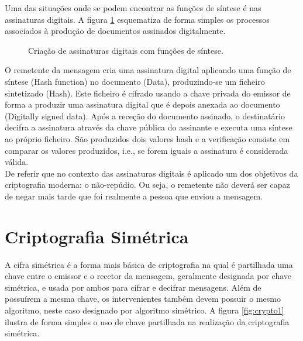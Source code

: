 \documentclass[a4paper,11pt,openright,oneside]{report}
\begin{document}
Uma das situações onde se podem encontrar as funções de síntese é nas assinaturas digitais. A figura \ref{fig:crypto5} esquematiza de forma simples os processos associados à produção de documentos assinados digitalmente.

\begin{figure}[ht]
\center
{}
\caption{Criação de assinaturas digitais com funções de síntese.}
\label{fig:crypto5}
\end{figure}

O remetente da mensagem cria uma assinatura digital aplicando uma função de síntese (Hash function) no documento (Data), produzindo-se um ficheiro sintetizado (Hash). Este ficheiro é cifrado usando a chave privada do emissor de forma a produzir uma assinatura digital que é depois anexada ao documento (Digitally signed data). Após a receção do documento assinado, o destinatário decifra a assinatura através da chave pública do assinante e executa uma síntese ao próprio ficheiro. São produzidos dois valores hash e a verificação consiste em comparar os valores produzidos, i.e., se forem iguais a assinatura é considerada válida.\\

De referir que no contexto das assinaturas digitais é aplicado um dos objetivos da criptografia moderna: o não-repúdio. Ou seja, o remetente não deverá ser capaz de negar mais tarde que foi realmente a pessoa que enviou a mensagem.

\section{Criptografia Simétrica}
\label{chalp.simétrica}

A cifra simétrica é a forma mais básica de criptografia na qual é partilhada uma chave entre o emissor e o recetor da mensagem, geralmente designada por chave simétrica, e usada por ambos para cifrar e decifrar mensagens. Além de possuírem a mesma chave, os intervenientes também devem possuir o mesmo algoritmo, neste caso designado por algoritmo simétrico. A figura \ref{fig:crypto1} ilustra de forma simples o uso de chave partilhada na realização da criptografia simétrica.
\end{document}
